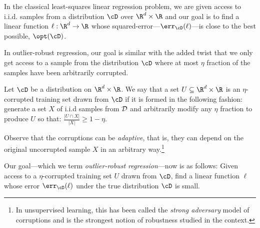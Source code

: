 In the classical least-squares linear regression problem, we are given access to i.i.d. samples from a distribution $\cD$ over $\R^d \times \R$ and our goal is to find a linear function $\ell:\R^d \to \R$ whose squared-error---$\err_{\cD}(\ell)$---is close to the best possible, $\opt(\cD)$. 

In outlier-robust regression, our goal is similar with the added twist that we only get access to a sample from the distribution $\cD$ where at most $\eta$ fraction of the samples have been arbitrarily corrupted.
\begin{definition}
Let $\cD$ be a distribution on $\R^d \times \R$. We say that a set $U \subseteq \R^d \times \R$ is an $\eta$-corrupted training set drawn from $\cD$ if it is formed in the
following fashion: generate a set $X$ of i.i.d samples from ${\cal D}$ and arbitrarily modify any $\eta$ fraction to produce $U$ so that:
$\frac{|U \cap X|}{|X|} \geq 1 - \eta$.
\end{definition}
Observe that the corruptions can be \emph{adaptive}, that is, they can depend on the original uncorrupted sample $X$ in an arbitrary way.\footnote{In unsupervised learning, this has been called the \emph{strong adversary} model of corruptions and is the strongest notion of robustness studied in the context.}

Our goal---which we term \emph{outlier-robust regression}---now is as follows: Given access to a $\eta$-corrupted training set $U$ drawn from $\cD$, find a linear function $\ell$ whose error $\err_{\cD}(\ell)$ under the true distribution $\cD$ is small. 



